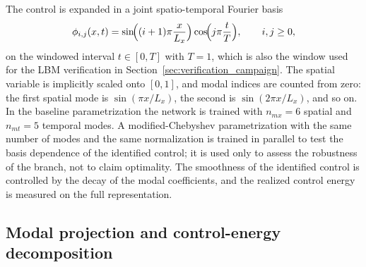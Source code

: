 \documentclass[aip,pof,reprint,superscriptaddress]{revtex4-2}
\begin{document}
The control is expanded in a joint spatio-temporal Fourier basis
\begin{equation}\label{eq:phi}
\phi_{i,j}(x,t)=\sin\!\Bigl((i+1)\pi\frac{x}{L_x}\Bigr)\cos\!\Bigl(j\pi\frac{t}{T}\Bigr),
\qquad i,j\ge0,
\end{equation}
on the windowed interval $t\in[0,T]$ with $T=1$, which is also the window used for the LBM verification in Section~\ref{sec:verification_campaign}. The spatial variable is implicitly scaled onto $[0,1]$, and modal indices are counted from zero: the first spatial mode is $\sin(\pi x/L_x)$, the second is $\sin(2\pi x/L_x)$, and so on. In the baseline parametrization the network is trained with $n_{mx}=6$ spatial and $n_{mt}=5$ temporal modes. A modified-Chebyshev parametrization with the same number of modes and the same normalization is trained in parallel to test the basis dependence of the identified control; it is used only to assess the robustness of the branch, not to claim optimality. The smoothness of the identified control is controlled by the decay of the modal coefficients, and the realized control energy is measured on the full representation.

\subsection{Modal projection and control-energy decomposition}
\end{document}
